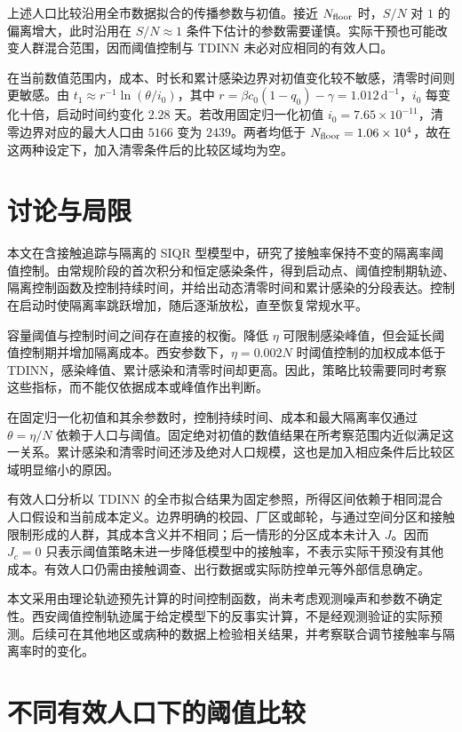 \documentclass[UTF8,a4paper,10pt,fontset=fandol]{ctexart}
\theoremstyle{cnplain}
\theoremstyle{remark}
\numberwithin{equation}{section}
\begin{document}
上述人口比较沿用全市数据拟合的传播参数与初值。接近 $N_{\rm floor}$ 时，$S/N$ 对 $1$ 的偏离增大，此时沿用在 $S/N\approx1$ 条件下估计的参数需要谨慎。实际干预也可能改变人群混合范围，因而阈值控制与 TDINN 未必对应相同的有效人口。

在当前数值范围内，成本、时长和累计感染边界对初值变化较不敏感，清零时间则更敏感。由 $t_1\approx r^{-1}\ln(\theta/i_0)$，其中 $r=\beta c_0(1-q_0)-\gamma=1.012\,\mathrm{d}^{-1}$，$i_0$ 每变化十倍，启动时间约变化 $2.28$ 天。若改用固定归一化初值 $i_0=7.65\times10^{-11}$，清零边界对应的最大人口由 $5166$ 变为 $2439$。两者均低于 $N_{\rm floor}=1.06\times10^4$，故在这两种设定下，加入清零条件后的比较区域均为空。

\section{讨论与局限}
\label{sec:discussion}

本文在含接触追踪与隔离的 SIQR 型模型中，研究了接触率保持不变的隔离率阈值控制。由常规阶段的首次积分和恒定感染条件，得到启动点、阈值控制期轨迹、隔离控制函数及控制持续时间，并给出动态清零时间和累计感染的分段表达。控制在启动时使隔离率跳跃增加，随后逐渐放松，直至恢复常规水平。

容量阈值与控制时间之间存在直接的权衡。降低 $\eta$ 可限制感染峰值，但会延长阈值控制期并增加隔离成本。西安参数下，$\eta=0.002N$ 时阈值控制的加权成本低于 TDINN，感染峰值、累计感染和清零时间却更高。因此，策略比较需要同时考察这些指标，而不能仅依据成本或峰值作出判断。

在固定归一化初值和其余参数时，控制持续时间、成本和最大隔离率仅通过 $\theta=\eta/N$ 依赖于人口与阈值。固定绝对初值的数值结果在所考察范围内近似满足这一关系。累计感染和清零时间还涉及绝对人口规模，这也是加入相应条件后比较区域明显缩小的原因。

有效人口分析以 TDINN 的全市拟合结果为固定参照，所得区间依赖于相同混合人口假设和当前成本定义。边界明确的校园、厂区或邮轮，与通过空间分区和接触限制形成的人群，其成本含义并不相同；后一情形的分区成本未计入 $J$。因而 $J_c=0$ 只表示阈值策略未进一步降低模型中的接触率，不表示实际干预没有其他成本。有效人口仍需由接触调查、出行数据或实际防控单元等外部信息确定。

本文采用由理论轨迹预先计算的时间控制函数，尚未考虑观测噪声和参数不确定性。西安阈值控制轨迹属于给定模型下的反事实计算，不是经观测验证的实际预测。后续可在其他地区或病种的数据上检验相关结果，并考察联合调节接触率与隔离率时的变化。

\clearpage
\appendix
\section{不同有效人口下的阈值比较}
\label{app:panel_eta_N}
\end{document}
